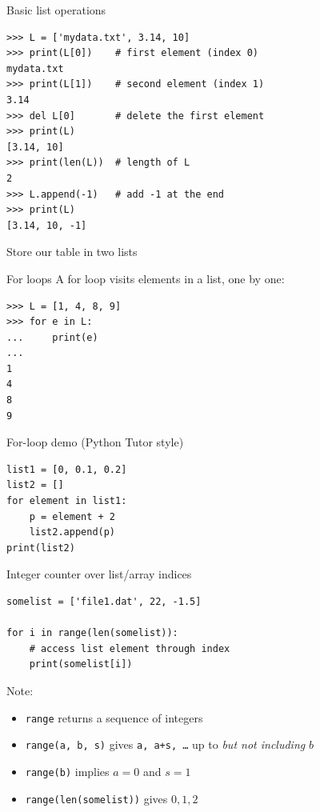 \begin{frame}[fragile]{Basic list operations}
\begin{lstlisting}[style=pythonTiny]
>>> L = ['mydata.txt', 3.14, 10]
>>> print(L[0])    # first element (index 0)
mydata.txt
>>> print(L[1])    # second element (index 1)
3.14
>>> del L[0]       # delete the first element
>>> print(L)
[3.14, 10]
>>> print(len(L))  # length of L
2
>>> L.append(-1)   # add -1 at the end
>>> print(L)
[3.14, 10, -1]
\end{lstlisting}
\end{frame}

\begin{frame}[fragile]{Store our table in two lists}

\end{frame}

\begin{frame}[fragile]{For loops}
  A for loop visits elements in a list, one by one:
\begin{lstlisting}[style=pythoncompact]
>>> L = [1, 4, 8, 9]
>>> for e in L:
...     print(e)
...
1
4
8
9
\end{lstlisting}
\end{frame}

\begin{frame}[fragile]{For-loop demo (Python Tutor style)}
\begin{lstlisting}[style=pythoncompact]
list1 = [0, 0.1, 0.2]
list2 = []
for element in list1:
    p = element + 2
    list2.append(p)
print(list2)
\end{lstlisting}
\end{frame}

\begin{frame}[fragile]{Integer counter over list/array indices}
\begin{lstlisting}[style=pythoncompact]
somelist = ['file1.dat', 22, -1.5]

for i in range(len(somelist)):
    # access list element through index
    print(somelist[i])
\end{lstlisting}
  Note:
  \begin{itemize}
    \item \texttt{range} returns a sequence of integers
    \item \texttt{range(a, b, s)} gives \texttt{a, a+s, \ldots} up to
          \emph{but not including} $b$
    \item \texttt{range(b)} implies $a=0$ and $s=1$
    \item \texttt{range(len(somelist))} gives $0,1,2$
  \end{itemize}
\end{frame}

